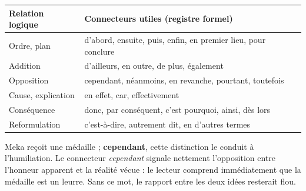 \documentclass[11pt]{article}
\begin{document}
\begin{center}
\begin{tabularx}{\linewidth}{|l|X|}
\hline
\rowcolor{popblueL} \textbf{Relation logique} & \textbf{Connecteurs utiles (registre formel)} \\
\hline
Ordre, plan & d'abord, ensuite, puis, enfin, en premier lieu, pour conclure \\
\hline
Addition & d'ailleurs, en outre, de plus, également \\
\hline
Opposition & cependant, néanmoins, en revanche, pourtant, toutefois \\
\hline
Cause, explication & en effet, car, effectivement \\
\hline
Conséquence & donc, par conséquent, c'est pourquoi, ainsi, dès lors \\
\hline
Reformulation & c'est-à-dire, autrement dit, en d'autres termes \\
\hline
\end{tabularx}
\end{center}

\begin{exemplebox}
\og Meka reçoit une médaille ; \textbf{cependant}, cette distinction le conduit à l'humiliation. \fg{} Le connecteur \emph{cependant} signale nettement l'opposition entre l'honneur apparent et la réalité vécue : le lecteur comprend immédiatement que la médaille est un leurre. Sans ce mot, le rapport entre les deux idées resterait flou.
\end{exemplebox}
\end{document}

